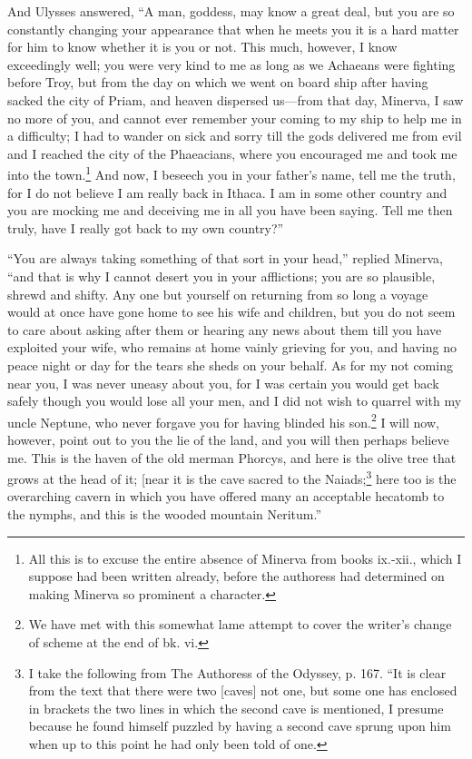 And Ulysses answered, “A man, goddess, may know a great deal, but you are so
constantly changing your appearance that when he meets you it is a hard matter
for him to know whether it is you or not. This much, however, I know
exceedingly well; you were very kind to me as long as we Achaeans were fighting
before Troy, but from the day on which we went on board ship after having
sacked the city of Priam, and heaven dispersed us—from that day, Minerva, I saw
no more of you, and cannot ever remember your coming to my ship to help me in a
difficulty; I had to wander on sick and sorry till the gods delivered me from
evil and I reached the city of the Phaeacians, where you encouraged me and took
me into the town.\footnote{All this is to excuse the entire absence of Minerva from books ix.-xii.,
which I suppose had been written already, before the authoress had determined
on making Minerva so prominent a character.} And now, I beseech you in your
father’s name, tell me the truth, for I do not believe I am really back in
Ithaca. I am in some other country and you are mocking me and deceiving me in
all you have been saying. Tell me then truly, have I really got back to my own
country?”

“You are always taking something of that sort in your head,” replied Minerva,
“and that is why I cannot desert you in your afflictions; you are so plausible,
shrewd and shifty. Any one but yourself on returning from so long a voyage
would at once have gone home to see his wife and children, but you do not seem
to care about asking after them or hearing any news about them till you have
exploited your wife, who remains at home vainly grieving for you, and having no
peace night or day for the tears she sheds on your behalf. As for my not coming
near you, I was never uneasy about you, for I was certain you would get back
safely though you would lose all your men, and I did not wish to quarrel with
my uncle Neptune, who never forgave you for having blinded his son.\footnote{We have met with this somewhat lame attempt to cover the writer’s change of
scheme at the end of bk. vi.} I will now,
however, point out to you the lie of the land, and you will then perhaps
believe me. This is the haven of the old merman Phorcys, and here is the olive
tree that grows at the head of it; [near it is the cave sacred to the Naiads;\footnote{I take the following from The Authoress of the Odyssey, p. 167. “It is clear
from the text that there were two [caves] not one, but some one has enclosed
in brackets the two lines in which the second cave is mentioned, I presume
because he found himself puzzled by having a second cave sprung upon him when
up to this point he had only been told of one.} here too is
the overarching cavern in which you have offered many an acceptable hecatomb to
the nymphs, and this is the wooded mountain Neritum.”

